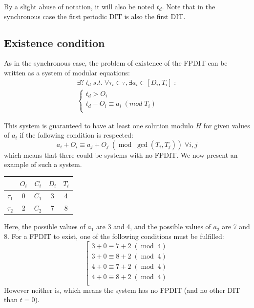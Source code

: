 \documentclass[conference]{IEEEtran}
\begin{document}
    By a slight abuse of notation, it will also be noted $t_d$. Note that in the
    synchronous case the first periodic DIT is also the first DIT.

  \subsection{Existence condition}
  \label{sct:FPDITexist}

		As in the synchronous case, the problem of existence of the FPDIT
		can be written as a system of modular equations:
		\begin{equation}
			\begin{array}{l}
				\exists ? \; t_d \; s.t. \; \forall \tau_i \in \tau, \exists a_i \in [D_i,
				T_i] \; :\\
				\left\{
					\begin{array}{l}
						t_d > O_i \\
						t_d - O_i \equiv a_i \; (mod \;	T_i)
						\\
					\end{array}
				\right.
			\end{array}
		\end{equation}

		This system is guaranteed to have at least one solution modulo $H$ for given
		values of $a_i$ if the following condition is respected:
		\begin{equation}
			a_i + O_i \equiv a_j + O_j \; (\operatorname{mod} \; \operatorname{gcd}(T_i, T_j)) \; \forall i,j
		\end{equation}
		which means that there could be systems with no FPDIT.
		We now present an example of such a system.\\

		\begin{center}
			\begin{tabular}{|r|c|c|c|c|}
				\hline
							& $O_i$ & $C_i$ & $D_i$ & $T_i$ \\ \hline
				$\tau_1$ 	& 0 	& $C_1$ & 3 	& 4\\ \hline
				$\tau_2$ 	& 2 	& $C_2$ & 7 	& 8\\ \hline
			\end{tabular}
		\end{center}

		Here, the possible values of $a_1$ are 3 and 4, and the possible values
		of $a_2$ are 7 and 8. For a FPDIT to exist, one of the following
		conditions must be fulfilled:
		\[
			\left[
			\begin{array}{c}
				3 + 0 \equiv 7 + 2 \; (\operatorname{mod} \; 4 ) \\
				3 + 0 \equiv 8 + 2 \; (\operatorname{mod} \; 4 ) \\
				4 + 0 \equiv 7 + 2 \; (\operatorname{mod} \; 4 ) \\
				4 + 0 \equiv 8 + 2 \; (\operatorname{mod} \; 4 ) \\
			\end{array}
			\right.
		\]
		However neither is, which means the system has
		no FPDIT (and no other DIT than $t=0$).
\end{document}
